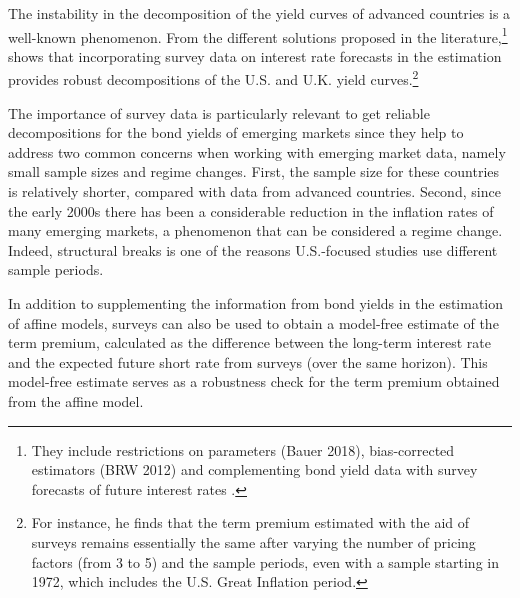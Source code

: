{The instability in the decomposition of the yield curves of advanced countries is a well-known phenomenon.
From the different solutions proposed in the literature,\footnote{ They include restrictions on parameters \citep{Duffee:2010} (Bauer 2018), bias-corrected estimators (BRW 2012) and complementing bond yield data with survey forecasts of future interest rates \citep{KimWright:2005,KimOrphanides:2012}.} 
\cite{Guimaraes:2014} shows that incorporating survey data on interest rate forecasts in the estimation provides robust decompositions of the U.S. and U.K. yield curves.\footnote{ For instance, he finds that the term premium estimated with the aid of surveys remains essentially the same after varying the number of pricing factors (from 3 to 5) and the sample periods, even with a sample starting in 1972, which includes the U.S. Great Inflation period.} 


The importance of survey data is particularly relevant to get reliable decompositions for the bond yields of emerging markets since they help to address two common concerns when working with emerging market data, namely small sample sizes and regime changes.
First, the sample size for these countries is relatively shorter, compared with data from advanced countries.
Second, since the early 2000s there has been a considerable reduction in the inflation rates of many emerging markets, a phenomenon that can be considered a regime change. 
Indeed, structural breaks is one of the reasons U.S.-focused studies use different sample periods.

In addition to supplementing the information from bond yields in the estimation of affine models, surveys can also be used to obtain a model-free estimate of the term premium, calculated as the difference between the long-term interest rate and the expected future short rate from surveys (over the same horizon). This model-free estimate serves as a robustness check for the term premium obtained from the affine model.

}
